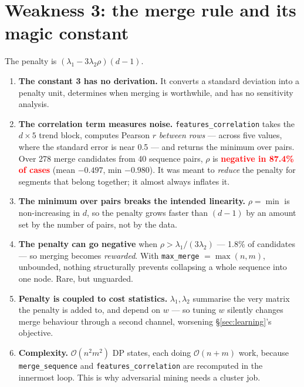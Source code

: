 \documentclass[11pt]{article}
\newcommand{\code}[1]{\texttt{\small #1}}
\newcommand{\finding}[1]{\textcolor{red}{\textbf{#1}}}
\begin{document}
\section{Weakness 3: the merge rule and its magic constant}
\label{sec:merge}
The penalty is $(\lambda_1 - 3\lambda_2\rho)(d-1)$.

\begin{enumerate}[leftmargin=*,label=\textbf{(\alph*)}]
  \item \textbf{The constant 3 has no derivation.} It converts a standard deviation into a
  penalty unit, determines when merging is worthwhile, and has no sensitivity analysis.
  \item \textbf{The correlation term measures noise.} \code{features\_correlation} takes the
  $d\times5$ trend block, computes Pearson $r$ \emph{between rows} --- across five values,
  where the standard error is near 0.5 --- and returns the minimum over pairs. Over 278 merge
  candidates from 40 sequence pairs, $\rho$ is \finding{negative in 87.4\% of cases} (mean
  $-0.497$, min $-0.980$). It was meant to \emph{reduce} the penalty for segments that belong
  together; it almost always inflates it.
  \item \textbf{The minimum over pairs breaks the intended linearity.} $\rho=\min$ is
  non-increasing in $d$, so the penalty grows faster than $(d-1)$ by an amount set by the
  number of pairs, not by the data.
  \item \textbf{The penalty can go negative} when $\rho > \lambda_1/(3\lambda_2)$ --- 1.8\%
  of candidates --- so merging becomes \emph{rewarded}. With \code{max\_merge} $=\max(n,m)$,
  unbounded, nothing structurally prevents collapsing a whole sequence into one node. Rare,
  but unguarded.
  \item \textbf{Penalty is coupled to cost statistics.} $\lambda_1,\lambda_2$ summarise the
  very matrix the penalty is added to, and depend on $w$ --- so tuning $w$ silently changes
  merge behaviour through a second channel, worsening \S\ref{sec:learning}'s objective.
  \item \textbf{Complexity.} $\mathcal{O}(n^2m^2)$ DP states, each doing $\mathcal{O}(n+m)$
  work, because \code{merge\_sequence} and \code{features\_correlation} are recomputed in the
  innermost loop. This is why adversarial mining needs a cluster job.
\end{enumerate}
\end{document}
